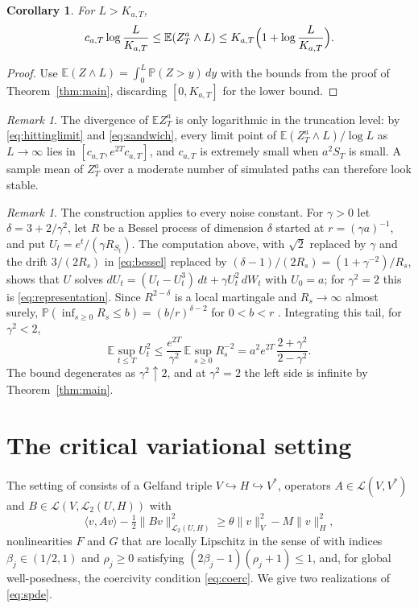 \documentclass[11pt]{amsart}
\newtheorem{corollary}[theorem]{Corollary}
\theoremstyle{remark}
\newtheorem{remark}[theorem]{Remark}
\newcommand{\E}{\mathbb E}
\newcommand{\Pp}{\mathbb P}
\newcommand{\HS}{\mathcal L_2}
\begin{document}
\begin{corollary}\label{cor:truncated}
For $L>K_{a,T}$,
\[
 c_{a,T}\log\frac{L}{K_{a,T}}\le\E(Z_T^a\wedge L)\le K_{a,T}\Bigl(1+\log\frac{L}{K_{a,T}}\Bigr).
\]
\end{corollary}

\begin{proof}
Use $\E(Z\wedge L)=\int_0^L\Pp(Z>y)\,dy$ with the bounds from the proof of Theorem~\ref{thm:main}, discarding $[0,K_{a,T}]$ for the lower bound.
\end{proof}

\begin{remark}\label{rem:mc}
The divergence of $\E Z_T^a$ is only logarithmic in the truncation level: by \eqref{eq:hittinglimit} and \eqref{eq:sandwich}, every limit point of $\E(Z_T^a\wedge L)/\log L$ as $L\to\infty$ lies in $[c_{a,T},e^{2T}c_{a,T}]$, and $c_{a,T}$ is extremely small when $a^2S_T$ is small. A sample mean of $Z_T^a$ over a moderate number of simulated paths can therefore look stable.
\end{remark}

\begin{remark}\label{rem:gamma}
The construction applies to every noise constant. For $\gamma>0$ let $\delta=3+2/\gamma^2$, let $R$ be a Bessel process of dimension $\delta$ started at $r=(\gamma a)^{-1}$, and put $U_t=e^t/(\gamma R_{S_t})$. The computation above, with $\sqrt2$ replaced by $\gamma$ and the drift $3/(2R_s)$ in \eqref{eq:bessel} replaced by $(\delta-1)/(2R_s)=(1+\gamma^{-2})/R_s$, shows that $U$ solves $dU_t=(U_t-U_t^3)\,dt+\gamma U_t^2\,dW_t$ with $U_0=a$; for $\gamma^2=2$ this is \eqref{eq:representation}. Since $R^{2-\delta}$ is a local martingale and $R_s\to\infty$ almost surely, $\Pp(\inf_{s\ge0}R_s\le b)=(b/r)^{\delta-2}$ for $0<b<r$ \cite[Chapter~XI]{RY99}. Integrating this tail, for $\gamma^2<2$,
\[
 \E\sup_{t\le T}U_t^2\le\frac{e^{2T}}{\gamma^2}\,\E\sup_{s\ge0}R_s^{-2}=a^2e^{2T}\,\frac{2+\gamma^2}{2-\gamma^2}.
\]
The bound degenerates as $\gamma^2\uparrow2$, and at $\gamma^2=2$ the left side is infinite by Theorem~\ref{thm:main}.
\end{remark}

\section{The critical variational setting}\label{sec:framework}

The setting of \cite[Section~6]{AV25} consists of a Gelfand triple $V\hookrightarrow H\hookrightarrow V^*$, operators $A\in\mathcal L(V,V^*)$ and $B\in\mathcal L(V,\HS(U,H))$ with
\[
 \langle v,Av\rangle-\tfrac12\|Bv\|_{\HS(U,H)}^2\ge\theta\|v\|_V^2-M\|v\|_H^2,
\]
nonlinearities $F$ and $G$ that are locally Lipschitz in the sense of \cite[Assumption~6.1(2)]{AV25} with indices $\beta_j\in(1/2,1)$ and $\rho_j\ge0$ satisfying $(2\beta_j-1)(\rho_j+1)\le1$, and, for global well-posedness, the coercivity condition \eqref{eq:coerc}. We give two realizations of \eqref{eq:spde}.
\end{document}
